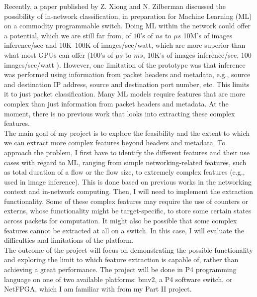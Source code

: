 \documentclass[12pt]{article}
\begin{document}
Recently, a paper published by Z. Xiong and N. Zilberman \cite{switchml} discussed the possibility of in-network classification, in preparation for Machine Learning (ML) on a commodity programmable switch. Doing ML within the network could offer a potential, which we are still far from, of $10$’s of $ns$ to $\mu s$ 10M’s of images inference/sec and 10K--100K of images/sec/watt, which are more superior than what most GPUs can offer (100’s of $\mu s$ to $ms$, 10K’s of images inference/sec, 100 images/sec/watt \cite{resnet}). However, one limitation of the prototype was that inference was performed using information from packet headers and metadata, e.g., source and destination IP address, source and destination port number, etc. This limits it to just packet classification. Many ML models require features that are more complex than just information from packet headers and metadata. At the moment, there is no previous work that looks into extracting these complex features.\\

The main goal of my project is to explore the feasibility and the extent to which we can extract more complex features beyond headers and metadata. To approach the problem, I first have to identify the different features and their use cases with regard to ML, ranging from simple networking-related features, such as total duration of a flow or the flow size, to extremely complex features (e.g., used in image inference). This is done based on previous works in the networking context and in-network computing. Then, I will need to implement the extraction functionality. Some of these complex features may require the use of counters or externs, whose functionality might be target-specific, to store some certain states across packets for computation. It might also be possible that some complex features cannot be extracted at all on a switch. In this case, I will evaluate the difficulties and limitations of the platform. \\

The outcome of the project will focus on demonstrating the possible functionality and exploring the limit to which feature extraction is capable of, rather than achieving a great performance. The project will be done in P4 programming language on one of two available platforms: bmv2, a P4 software switch, or NetFPGA, which I am familiar with from my Part II project.
\end{document}
